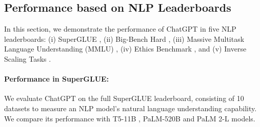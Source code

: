 \documentclass[11pt]{article}
\begin{document}
\subsection{Performance based on NLP Leaderboards} \label{par:understanding}
In this section, we demonstrate the performance of ChatGPT in five NLP leaderboards: (i) SuperGLUE \cite{super_glue}, (ii) Big-Bench Hard \cite{suzgun2022challenging}, (iii) Massive Multitask Language Understanding (MMLU) \cite{hendrycksmeasuring}, (iv) Ethics Benchmark \cite{hendrycks2021ethics}, and (v) Inverse Scaling Tasks \cite{wei2022inverse}.

\paragraph{Performance in SuperGLUE:} We evaluate ChatGPT on the full SuperGLUE leaderboard, consisting of 10 datasets to measure an NLP model's natural language understanding capability. We compare its performance with T5-11B \cite{t5}, PaLM-520B \cite{chowdhery2022palm} and PaLM 2-L \cite{palm2} models. 
\end{document}
